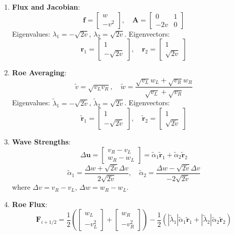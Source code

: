 \documentclass[12pt]{article}
\begin{document}
\begin{enumerate}
    \item \textbf{Flux and Jacobian}:
    \[
    \mathbf{f} = \begin{bmatrix} w \\ -v^2 \end{bmatrix}, \quad \mathbf{A} = \begin{bmatrix} 0 & 1 \\ -2v & 0 \end{bmatrix}
    \]
    Eigenvalues: \(\lambda_1 = -\sqrt{2v}\), \(\lambda_2 = \sqrt{2v}\). Eigenvectors:
    \[
    \mathbf{r}_1 = \begin{bmatrix} 1 \\ -\sqrt{2v} \end{bmatrix}, \quad \mathbf{r}_2 = \begin{bmatrix} 1 \\ \sqrt{2v} \end{bmatrix}
    \]

    \item \textbf{Roe Averaging}:
    \[
    \tilde{v} = \sqrt{v_L v_R}, \quad \tilde{w} = \frac{\sqrt{v_L} w_L + \sqrt{v_R} w_R}{\sqrt{v_L} + \sqrt{v_R}}
    \]
    Eigenvalues: \(\tilde{\lambda}_1 = -\sqrt{2 \tilde{v}}\), \(\tilde{\lambda}_2 = \sqrt{2 \tilde{v}}\). Eigenvectors:
    \[
    \tilde{\mathbf{r}}_1 = \begin{bmatrix} 1 \\ -\sqrt{2 \tilde{v}} \end{bmatrix}, \quad \tilde{\mathbf{r}}_2 = \begin{bmatrix} 1 \\ \sqrt{2 \tilde{v}} \end{bmatrix}
    \]

    \item \textbf{Wave Strengths}:
    \[
    \Delta \mathbf{u} = \begin{bmatrix} v_R - v_L \\ w_R - w_L \end{bmatrix} = \tilde{\alpha}_1 \tilde{\mathbf{r}}_1 + \tilde{\alpha}_2 \tilde{\mathbf{r}}_2
    \]
    \[
    \tilde{\alpha}_1 = \frac{\Delta w + \sqrt{2 \tilde{v}} \Delta v}{2 \sqrt{2 \tilde{v}}}, \quad \tilde{\alpha}_2 = \frac{\Delta w - \sqrt{2 \tilde{v}} \Delta v}{-2 \sqrt{2 \tilde{v}}}
    \]
    where \(\Delta v = v_R - v_L\), \(\Delta w = w_R - w_L\).

    \item \textbf{Roe Flux}:
    \[
    \mathbf{F}_{i+1/2} = \frac{1}{2} \left( \begin{bmatrix} w_L \\ -v_L^2 \end{bmatrix} + \begin{bmatrix} w_R \\ -v_R^2 \end{bmatrix} \right) - \frac{1}{2} \left( |\tilde{\lambda}_1| \tilde{\alpha}_1 \tilde{\mathbf{r}}_1 + |\tilde{\lambda}_2| \tilde{\alpha}_2 \tilde{\mathbf{r}}_2 \right)
    \]
\end{enumerate}
\end{document}
